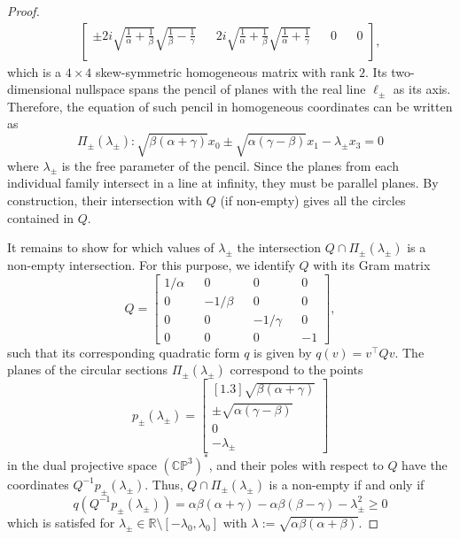 \documentclass[10pt, a4paper]{article}
\theoremstyle{BoldTopSpacing}
\theoremstyle{BoldTopSpacing}
\theoremstyle{BoldTopSpacing}
\theoremstyle{BoldTopBottomSpacing}
\theoremstyle{BoldTopSpacing}
\theoremstyle{BoldTopBottomSpacing}
\theoremstyle{remark}
\begin{document}
\begin{proof}
\begin{align*}
\begin{bmatrix}
\pm 2 i \sqrt{\frac{1}{\alpha} + \frac{1}{\beta}} \sqrt{\frac{1}{\beta} - \frac{1}{\gamma}} && 2 i \sqrt{\frac{1}{\alpha} + \frac{1}{\beta}}\sqrt{ \frac{1}{\alpha} + \frac{1}{\gamma}} && 0 && 0\\
\end{bmatrix},
\end{align*}
which is a $4 \times 4$ skew-symmetric homogeneous matrix with rank $2$. Its two-dimensional nullspace spans the pencil of planes with the real line $\ell_{\pm}$ as its axis. Therefore, the equation of such pencil in homogeneous coordinates can be written as
\[
    \Pi_{\pm}(\lambda_{\pm}) : \sqrt{\beta (\alpha + \gamma)} x_{0} \pm \sqrt{\alpha (\gamma - \beta)} x_{1} - \lambda_{\pm} x_{3} = 0
\]
where $\lambda_{\pm}$ is the free parameter of the pencil. Since the planes from each individual family intersect in a line at infinity, they must be parallel planes. By construction, their intersection with $Q$ (if non-empty) gives all the circles contained in $Q$. \par
It remains to show for which values of $\lambda_{\pm}$ the intersection $Q \cap \Pi_{\pm}(\lambda_{\pm})$ is a non-empty intersection. For this purpose, we identify $Q$ with its Gram matrix
\[
Q =
\begin{bmatrix}
1 / \alpha && 0 && 0 && 0 \\
0 && -1 / \beta && 0 && 0 \\
0 && 0 && -1 / \gamma && 0 \\
0 && 0 && 0 && -1
\end{bmatrix},
\]
such that its corresponding quadratic form $q$ is given by $q(v) = v^{\top} Q v$. The planes of the circular sections $\Pi_{\pm}(\lambda_{\pm})$ correspond to the points
\[
p_{\pm}({\lambda_{\pm}}) =
\begin{bmatrix}[1.3]
\sqrt{\beta (\alpha + \gamma)}\\
\pm \sqrt{\alpha (\gamma - \beta)}\\
0\\
-\lambda_{\pm}
\end{bmatrix}
\]
in the dual projective space $(\mathbb{C}\mathbb{P}^3)^{*}$, and their poles with respect to $Q$ have the coordinates $Q^{-1}p_{\pm}({\lambda_{\pm}})$. Thus, $Q \cap \Pi_{\pm}(\lambda_{\pm})$ is a non-empty if and only if
\[
    q(Q^{-1}p_{\pm}({\lambda_{\pm}})) = \alpha \beta (\alpha + \gamma) - \alpha \beta (\beta - \gamma) - \lambda_{\pm}^2 \geq 0
\]
which is satisfed for $\lambda_{\pm} \in \mathbb{R} \setminus \left[-\lambda_0, \lambda_0\right]$ with $\lambda := \sqrt{\alpha \beta (\alpha+\beta)}$.
\end{proof}
\end{document}
